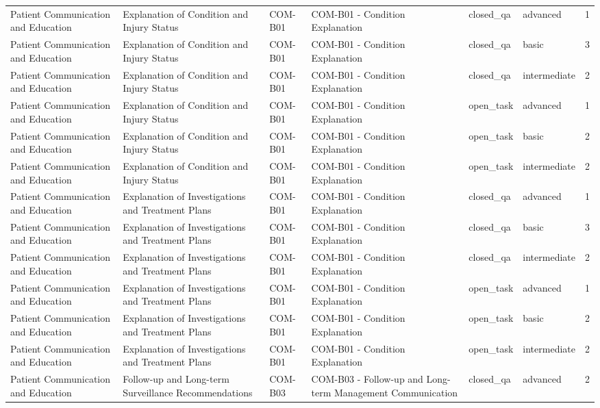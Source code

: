 \begin{tabular}{llllllr}
Patient Communication and Education & Explanation of Condition and Injury Status & COM-B01 & COM-B01 - Condition Explanation & closed_qa & advanced & 1 \\
Patient Communication and Education & Explanation of Condition and Injury Status & COM-B01 & COM-B01 - Condition Explanation & closed_qa & basic & 3 \\
Patient Communication and Education & Explanation of Condition and Injury Status & COM-B01 & COM-B01 - Condition Explanation & closed_qa & intermediate & 2 \\
Patient Communication and Education & Explanation of Condition and Injury Status & COM-B01 & COM-B01 - Condition Explanation & open_task & advanced & 1 \\
Patient Communication and Education & Explanation of Condition and Injury Status & COM-B01 & COM-B01 - Condition Explanation & open_task & basic & 2 \\
Patient Communication and Education & Explanation of Condition and Injury Status & COM-B01 & COM-B01 - Condition Explanation & open_task & intermediate & 2 \\
Patient Communication and Education & Explanation of Investigations and Treatment Plans & COM-B01 & COM-B01 - Condition Explanation & closed_qa & advanced & 1 \\
Patient Communication and Education & Explanation of Investigations and Treatment Plans & COM-B01 & COM-B01 - Condition Explanation & closed_qa & basic & 3 \\
Patient Communication and Education & Explanation of Investigations and Treatment Plans & COM-B01 & COM-B01 - Condition Explanation & closed_qa & intermediate & 2 \\
Patient Communication and Education & Explanation of Investigations and Treatment Plans & COM-B01 & COM-B01 - Condition Explanation & open_task & advanced & 1 \\
Patient Communication and Education & Explanation of Investigations and Treatment Plans & COM-B01 & COM-B01 - Condition Explanation & open_task & basic & 2 \\
Patient Communication and Education & Explanation of Investigations and Treatment Plans & COM-B01 & COM-B01 - Condition Explanation & open_task & intermediate & 2 \\
Patient Communication and Education & Follow-up and Long-term Surveillance Recommendations & COM-B03 & COM-B03 - Follow-up and Long-term Management Communication & closed_qa & advanced & 2 \\

\end{tabular}

